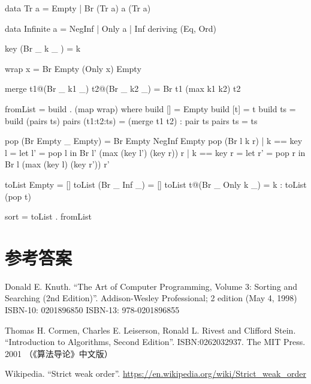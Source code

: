 \documentclass[b5paper]{ctexart}
\begin{document}
\begin{Haskell}
data Tr a = Empty | Br (Tr a) a (Tr a)

data Infinite a = NegInf | Only a | Inf deriving (Eq, Ord)

key (Br _ k _ ) = k

wrap x = Br Empty (Only x) Empty

merge t1@(Br _ k1 _) t2@(Br _ k2 _) = Br t1 (max k1 k2) t2

fromList = build . (map wrap) where
  build [] = Empty
  build [t] = t
  build ts = build (pairs ts)
  pairs (t1:t2:ts) = (merge t1 t2) : pair ts
  pairs ts = ts

pop (Br Empty _ Empty) = Br Empty NegInf Empty
pop (Br l k r) | k == key l = let l' = pop l in Br l' (max (key l') (key r)) r
               | k == key r = let r' = pop r in Br l (max (key l) (key r')) r'

toList Empty = []
toList (Br _ Inf _) = []
toList t@(Br _ Only k _) = k : toList (pop t)

sort = toList . fromList
\end{Haskell}

\ifx\wholebook\relax\else
\section{参考答案}
\shipoutAnswer

\begin{thebibliography}{99}

Donald E. Knuth. ``The Art of Computer Programming, Volume 3: Sorting and Searching (2nd Edition)''. Addison-Wesley Professional; 2 edition (May 4, 1998) ISBN-10: 0201896850 ISBN-13: 978-0201896855

Thomas H. Cormen, Charles E. Leiserson, Ronald L. Rivest and Clifford Stein.
``Introduction to Algorithms, Second Edition''. ISBN:0262032937. The MIT Press. 2001 （《算法导论》中文版）

Wikipedia. ``Strict weak order''. \url{https://en.wikipedia.org/wiki/Strict_weak_order}

\end{thebibliography}
\end{document}
